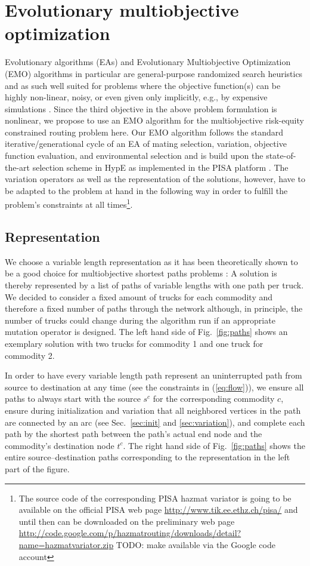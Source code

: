 \documentclass[preprint,12pt]{elsarticle}
\newcommand{\TODO}[1]{{\color{red}TODO: #1}}
\begin{document}
\section{Evolutionary multiobjective optimization}
\label{S_MEO}
Evolutionary algorithms (EAs) and Evolutionary Multiobjective Optimization (EMO) algorithms in particular are general-purpose randomized search heuristics and as such well suited for problems where the objective function(s) can be highly non-linear, noisy, or even given only implicitly, e.g., by expensive simulations \citep{deb2001a,cvl2007a}. Since the third objective in the above problem formulation is nonlinear, we propose to use an EMO algorithm for the multiobjective risk-equity constrained routing problem here. Our EMO algorithm follows the standard iterative/generational cycle of an EA of mating selection, variation, objective function evaluation, and environmental selection and is build upon the state-of-the-art selection scheme in HypE \citep{bz2011a} as implemented in the PISA platform \citep{bltz2003a}. The variation operators as well as the representation of the solutions, however, have to be adapted to the problem at hand in the following way in order to fulfill the problem's constraints at all times\footnote{The source code of the corresponding PISA hazmat variator is going to be available on the official PISA web page \url{http://www.tik.ee.ethz.ch/pisa/} and until then can be downloaded on the preliminary web page \url{http://code.google.com/p/hazmatrouting/downloads/detail?name=hazmatvariator.zip} \TODO{make available via the Google code account}}.

\subsection{Representation}
We choose a variable length representation as it has been theoretically shown to be a good choice for multiobjective shortest paths problems \citep{horo2009a}: A solution is thereby represented by a list of paths of variable lengths with one path per truck. We decided to consider a fixed amount of trucks for each commodity and therefore a fixed number of paths through the network although, in principle, the number of trucks could change during the algorithm run if an appropriate mutation operator is designed. The left hand side of Fig.~\ref{fig:paths} shows an exemplary solution with two trucks for commodity 1 and one truck for commodity 2.

In order to have every variable length path represent an uninterrupted path from source to destination at any time (see the constraints in (\ref{eq:flow})), we ensure all paths to always start with the source $s^c$ for the corresponding commodity $c$, ensure during initialization and variation that all neighbored vertices in the path are connected by an arc (see Sec.~\ref{sec:init} and \ref{sec:variation}), and complete each path by the shortest path between the path's actual end node and the commodity's destination node $t^c$. The right hand side of Fig.~\ref{fig:paths} shows the entire source--destination paths corresponding to the representation in the left part of the figure. 
\end{document}
